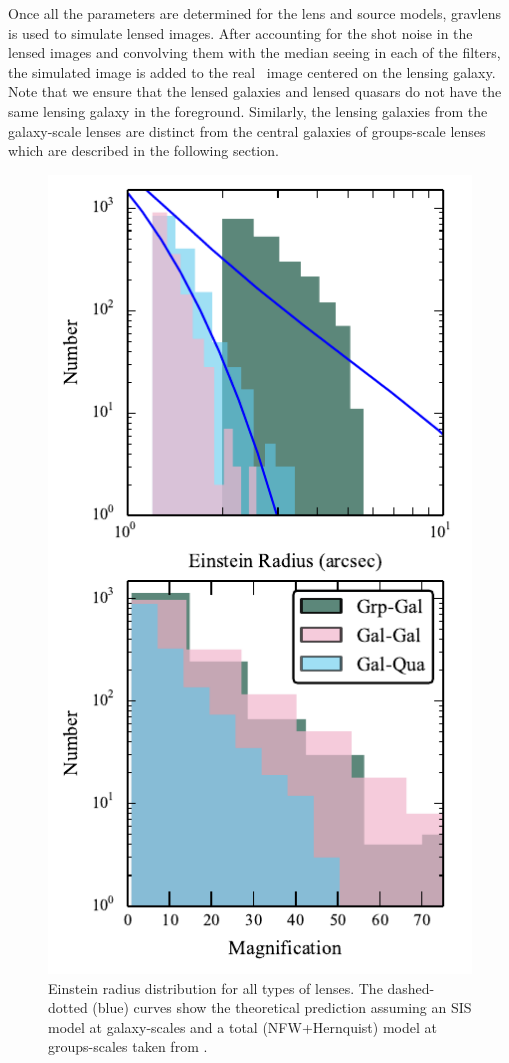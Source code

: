 \documentclass[useAMS,usenatbib,a4paper]{mn2e}
\begin{document}
Once all the parameters are determined for the lens and source models, {\sc
gravlens} is used to simulate lensed images.  After accounting for the shot
noise in the lensed images and convolving them with the median seeing in each of
the filters, the simulated image is added to the real \cfhtls~image centered
on the lensing galaxy. Note that we ensure that the lensed galaxies and
lensed quasars do not have the same lensing galaxy in the foreground. Similarly,
the lensing galaxies from the galaxy-scale lenses are distinct from the central
galaxies of groups-scale lenses which are described in the following section.


\begin{figure}
\begin{center}
\includegraphics[scale=1.2]{sw-cfhtls-figs/distrib_remu.pdf}
\caption{ \label{fig:remudist}
Einstein radius distribution for all types of lenses. The dashed-dotted (blue)
curves show the theoretical prediction assuming an SIS model at galaxy-scales
and a total (NFW+Hernquist) model at groups-scales taken from \citep{More2012}.
}
\end{center}
\end{figure}
\end{document}
